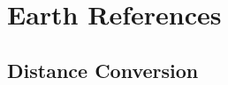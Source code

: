 \chapter{Earth References}
\label{ap:earth-references}
\setlength{\columnsep}{0.1cm}
\pagebreak
\section{Distance Conversion}
\begin{multicols*}{4}
\label{distance-conversion}
\end{multicols*}